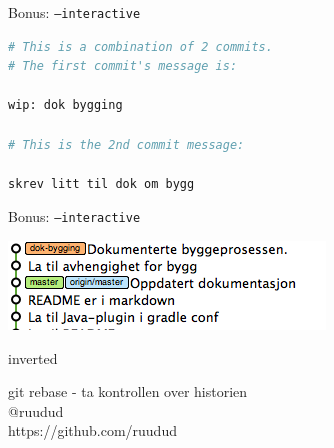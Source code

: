\documentclass{beamer}
\begin{document}
\begin{frame}[fragile]{Bonus: \texttt{--interactive}}
    \begin{lstlisting}[language=bash]
# This is a combination of 2 commits.                     
# The first commit's message is:                          
                                                          
wip: dok bygging                                          
                                                          
# This is the 2nd commit message:                         
                                                          
skrev litt til dok om bygg 
    \end{lstlisting}
\end{frame}

\begin{frame}{Bonus: \texttt{--interactive}}
    \begin{center}
        \includegraphics[scale=0.7]{7.png}
    \end{center}
\end{frame}

\begin{frame}
    \begin{beamercolorbox}[ignorebg]{inverted}
    \begin{center}
        \Huge{git rebase - ta kontrollen over historien}\\
        \vspace{1cm}
        \large{@ruudud \\ https://github.com/ruudud}
    \end{center}
    \end{beamercolorbox}%
\end{frame}
\end{document}

